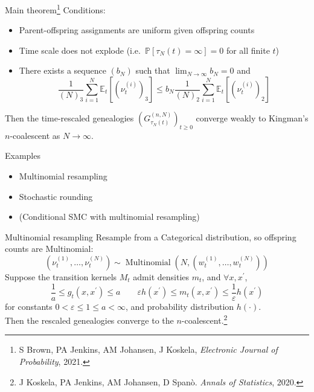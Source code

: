 \documentclass[aspectratio=169]{beamer}
\theoremstyle{definition}
\newcommand{\PR}{\mathbb{P}}
\newcommand{\E}{\mathbb{E}}
\newcommand{\Mn}{\operatorname{Multinomial}}
\newcommand{\vt}[2][t]{\nu_{#1}^{(#2)}}
\newcommand{\wt}[2][t]{w_{#1}^{(#2)}}
\begin{document}
\begin{frame}{Main theorem\footnote{S Brown, PA Jenkins, AM Johansen, J Koskela,  \textit{Electronic Journal of Probability}, 2021.}}
Conditions:
\begin{itemize}
\item Parent-offspring assignments are uniform given offspring counts
\pause
\item Time scale does not explode (i.e.\ $\PR[\tau_N(t)=\infty]=0$ for all finite $t$)
\pause
\item There exists a sequence $(b_N)$ such that $\lim_{N\to\infty} b_N = 0$ and
\begin{equation*}
\frac{1}{(N)_3} \sum_{i=1}^N \E_t [ (\vt{i})_3 ]
\leq b_N \frac{1}{(N)_2} \sum_{i=1}^N \E_t [ (\vt{i})_2 ]
\end{equation*}
\end{itemize}
\pause
Then the time-rescaled genealogies $\left( G_{\tau_N(t)}^{(n,N)} \right)_{t\geq0}$ converge weakly to Kingman's $n$-coalescent as $N\to\infty$.
\end{frame}


\begin{frame}{Examples}
\begin{itemize}
\item Multinomial resampling
\item Stochastic rounding 
\item (Conditional SMC with multinomial resampling)
\end{itemize}
\end{frame}


\begin{frame}{Multinomial resampling}
Resample from a Categorical distribution, so offspring counts are Multinomial:
\begin{equation*}
(\vt{1} , \dots, \vt{N}) \sim \Mn \left( N, (\wt{1},\dots,\wt{N}) \right)
\end{equation*}
\pause
Suppose the transition kernels $M_t$ admit densities $m_t$, and $\forall x, x^\prime$,
\begin{equation*}
\frac{1}{a} \leq g_t(x, x^\prime) \leq a \qquad
\varepsilon h(x^\prime) \leq m_t(x, x^\prime) \leq \frac{1}{\varepsilon} h(x^\prime) 
\end{equation*}
for constants $0<\varepsilon\leq 1\leq a<\infty$, and probability distribution $h(\cdot)$.\\[10pt]
\pause
Then the rescaled genealogies converge to the $n$-coalescent.\footnote{J Koskela, PA Jenkins, AM Johansen, D Span\`o. \textit{Annals of Statistics}, 2020.}
\end{frame}
\end{document}
